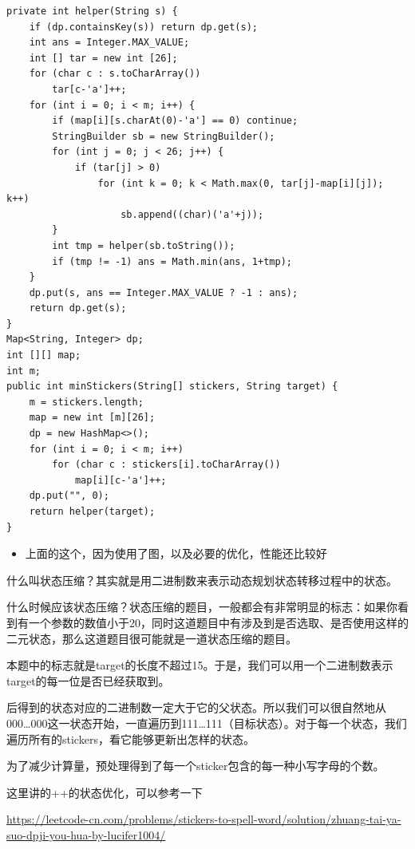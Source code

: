 \documentclass[9pt, b5paaper]{book}
\begin{document}
\begin{verbatim}
private int helper(String s) {
    if (dp.containsKey(s)) return dp.get(s);
    int ans = Integer.MAX_VALUE;
    int [] tar = new int [26];
    for (char c : s.toCharArray())
        tar[c-'a']++;
    for (int i = 0; i < m; i++) {
        if (map[i][s.charAt(0)-'a'] == 0) continue;
        StringBuilder sb = new StringBuilder();
        for (int j = 0; j < 26; j++) {
            if (tar[j] > 0)
                for (int k = 0; k < Math.max(0, tar[j]-map[i][j]); k++)
                    sb.append((char)('a'+j));
        }
        int tmp = helper(sb.toString());
        if (tmp != -1) ans = Math.min(ans, 1+tmp);
    }
    dp.put(s, ans == Integer.MAX_VALUE ? -1 : ans);
    return dp.get(s);
}
Map<String, Integer> dp;
int [][] map;
int m;
public int minStickers(String[] stickers, String target) {
    m = stickers.length;
    map = new int [m][26];
    dp = new HashMap<>();
    for (int i = 0; i < m; i++) 
        for (char c : stickers[i].toCharArray()) 
            map[i][c-'a']++;
    dp.put("", 0);
    return helper(target);
}
\end{verbatim}
\begin{itemize}
\item 上面的这个，因为使用了图，以及必要的优化，性能还比较好
\end{itemize}

什么叫状态压缩？其实就是用二进制数来表示动态规划状态转移过程中的状态。

什么时候应该状态压缩？状态压缩的题目，一般都会有非常明显的标志：如果你看到有一个参数的数值小于20，同时这道题目中有涉及到是否选取、是否使用这样的二元状态，那么这道题目很可能就是一道状态压缩的题目。

本题中的标志就是target的长度不超过15。于是，我们可以用一个二进制数表示target的每一位是否已经获取到。

后得到的状态对应的二进制数一定大于它的父状态。所以我们可以很自然地从000\ldots{}000这一状态开始，一直遍历到111\ldots{}111（目标状态）。对于每一个状态，我们遍历所有的stickers，看它能够更新出怎样的状态。

为了减少计算量，预处理得到了每一个sticker包含的每一种小写字母的个数。

这里讲的++的状态优化，可以参考一下

\url{https://leetcode-cn.com/problems/stickers-to-spell-word/solution/zhuang-tai-ya-suo-dpji-you-hua-by-lucifer1004/}
\end{document}
